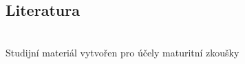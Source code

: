 \documentclass[../main.tex]{subfiles}
\begin{document}
\fontsize{10pt}{10pt}\selectfont\setlength\parindent{0em}
\pagestyle{empty}
\pagecolor{MPC}
\vspace{\fill}

\begin{center}
{\color{white}
\part{Literatura}
}
{\color{white}\LARGE \WSauthor}\\
\vspace*{1em}
{\color{white}\Large Studijní materiál vytvořen pro účely maturitní zkoušky}
\end{center}


\newpage
\pagecolor{white}

\blankpage

\newpage
\end{document}
